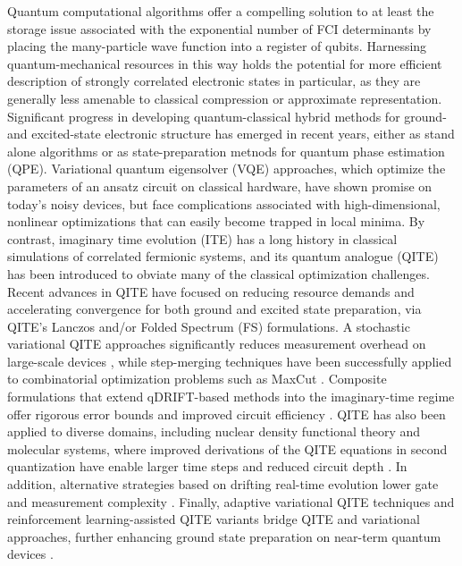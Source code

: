 \documentclass[aip,jcp,amsmath,amssymb, reprint]{revtex4-1}
\begin{document}
Quantum computational algorithms offer a compelling solution to at least the storage issue associated with the exponential number of FCI determinants by placing the many-particle wave function into a register of qubits.\cite{4,5} 
Harnessing quantum-mechanical resources in this way holds the potential for more efficient description of strongly correlated electronic states in particular, as they are generally less amenable to classical compression or approximate representation. 
Significant progress in developing quantum-classical hybrid methods for ground- and excited-state electronic structure has emerged in recent years, either as stand alone algorithms or as state-preparation metnods for quantum phase estimation (QPE)\cite{}. 
Variational quantum eigensolver (VQE) approaches,\cite{6,7-9,10-13,14-16} which optimize the parameters of an ansatz circuit on classical hardware, have shown promise on today's noisy devices, but face complications associated with high-dimensional, nonlinear optimizations that can easily become trapped in local minima. 
By contrast, imaginary time evolution (ITE) has a long history in classical simulations of correlated fermionic systems,\cite{25-32} and its quantum analogue (QITE) has been introduced\cite{17} to obviate many of the classical optimization challenges. 
Recent advances in QITE have focused on reducing resource demands and accelerating convergence for both ground and excited state preparation, via QITE's Lanczos and/or Folded Spectrum (FS) formulations.
A stochastic variational QITE approaches \cite{} significantly reduces measurement overhead on large-scale devices \cite{Gacon2023SAQITE}, while step-merging techniques have been successfully applied to combinatorial optimization problems such as MaxCut \cite{Alam2023MaxCut}. 
Composite formulations that extend qDRIFT-based methods into the imaginary-time regime offer rigorous error bounds and improved circuit efficiency \cite{Pocrnic2023CQdrift, Hagan2023CompositeQS}. 
QITE has also been applied to diverse domains, including nuclear density functional theory \cite{Li2024NuclearQITE} and molecular systems, where improved derivations of the QITE equations in second quantization have enable larger time steps and reduced circuit depth \cite{Tsuchimochi2023Improved}. 
In addition, alternative strategies based on drifting real-time evolution lower gate and measurement complexity \cite{Huang2023Drift}. 
Finally, adaptive variational QITE techniques and reinforcement learning-assisted QITE variants bridge QITE and variational approaches, further enhancing ground state preparation on near-term quantum devices \cite{Gomes2021AVQITE, Cao2022RLQITE}.
\end{document}
